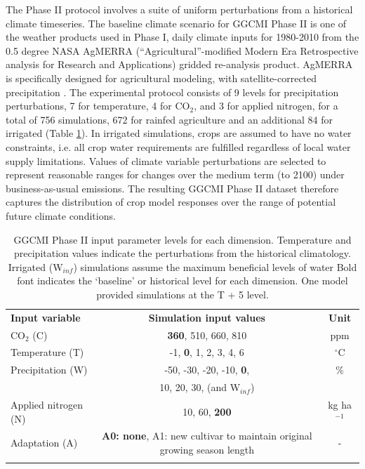 \documentclass[gmd, manuscript]{copernicus} %
\begin{document}
The Phase II protocol involves a suite of uniform perturbations from a historical climate timeseries.
The baseline climate scenario for GGCMI Phase II is one of the weather products used in Phase I, daily climate inputs for 1980-2010 from the 0.5 degree NASA AgMERRA (``Agricultural''-modified Modern Era Retrospective analysis for Research and Applications) gridded re-analysis product. AgMERRA is specifically designed for agricultural modeling, with satellite-corrected precipitation \citep{Ruane2015}. 
The experimental protocol consists of 9 levels for precipitation perturbations, 7 for temperature, 4 for CO$_2$, and 3 for applied nitrogen, for a total of 756 simulations, 672 for rainfed agriculture and an additional 84 for irrigated (Table \ref{table:inputs}). 
In irrigated simulations, crops are assumed to have no water constraints, i.e. all crop water requirements are fulfilled regardless of local water supply limitations.
Values of climate variable perturbations are selected to represent reasonable ranges for changes over the medium term (to 2100) under business-as-usual emissions. 
The resulting GGCMI Phase II dataset therefore captures the distribution of crop model responses over the range of potential future climate conditions.

\begin{table}[t]
  \caption{
  GGCMI Phase II input parameter levels for each dimension. Temperature and precipitation values indicate the perturbations from the historical climatology. Irrigated (W$_{inf}$) simulations assume the maximum beneficial levels of water Bold font indicates the `baseline' or historical level for each dimension. One model provided simulations at the T + 5 level.
  }
  \label{table:inputs} 
  \begin{tabular}{lcc} 
      \tophline \vspace{1mm}
      \textbf{Input variable} & \textbf{Simulation input values} & \textbf{Unit} \\ \middlehline \vspace{1mm}
      CO$_2$ (C) & \textbf{360}, 510, 660, 810 & ppm\\ \middlehline \vspace{1mm}
      Temperature (T) & -1, \textbf{0}, 1, 2, 3, 4, 6 & $^{\circ}$C\\ \middlehline \vspace{1mm}
      Precipitation (W) & -50, -30, -20, -10, \textbf{0}, & \% \\
      {} & 10, 20, 30, (and W$_{inf}$) & {} \\ \middlehline \vspace{1mm}
      Applied nitrogen (N) & 10, 60, \textbf{200} & kg ha$^{-1}$ \\ \middlehline \vspace{1mm}
      Adaptation (A) & \textbf{A0: none}, A1: new cultivar to maintain original growing season length & -\\ \bottomhline
  \end{tabular}\\
\end{table}
\end{document}
